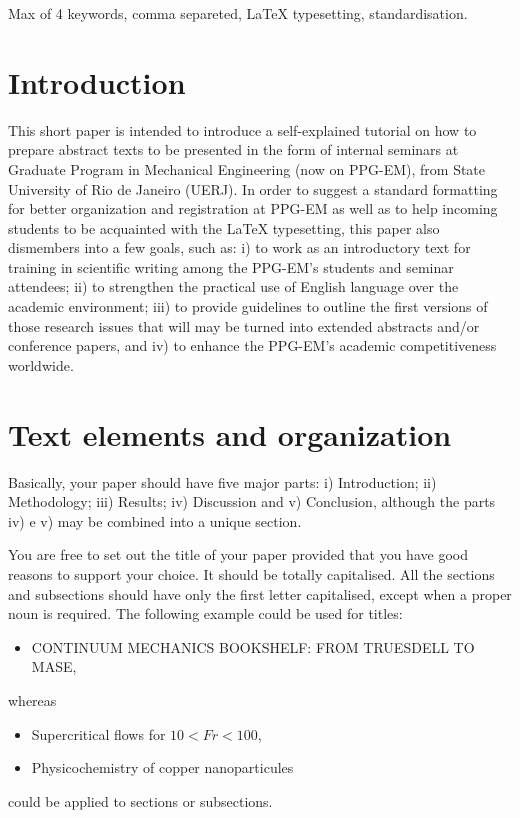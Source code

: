 \documentclass[date]{ppgem}
\begin{document}
\thispagestyle{plain}
\makeheader

\begin{multicols}{2}

\begin{keywords}
Max of 4 keywords, comma separeted, {\LaTeX} typesetting, standardisation.
\end{keywords}

\section{Introduction}

This short paper is intended to introduce a self-explained tutorial on how to prepare abstract texts to be presented in the form of internal seminars at Graduate Program in Mechanical Engineering (now on PPG-EM), from State University of Rio de Janeiro (UERJ). In order to suggest a standard formatting for better organization and registration at PPG-EM as well as to help incoming students to be acquainted with the {\LaTeX} typesetting, this paper also dismembers into a few goals, such as: i) to work as an introductory text for training in scientific writing among the PPG-EM's students and seminar attendees; ii) to strengthen the practical use of English language over the academic environment; iii) to provide guidelines to outline the first versions of those research issues that will may be turned into extended abstracts and/or conference papers, and iv) to enhance the PPG-EM's academic competitiveness worldwide. 

\section{Text elements and organization}

Basically, your paper should have five major parts: i) Introduction; ii) Methodology; iii) Results; iv) Discussion and v) Conclusion, although the parts iv) e v) may be combined into a unique section. 

You are free to set out the title of your paper provided that you have
good reasons to support your choice. It should be totally capitalised.
All the sections and subsections should have only the first letter
capitalised, except when a proper noun is required. The following
example could be used for titles:
\begin{itemize}
\item CONTINUUM MECHANICS BOOKSHELF: FROM TRUESDELL TO MASE, 
\end{itemize}
whereas
\begin{itemize}
\item  Supercritical flows for $ 10 < Fr < 100 $, \\
\item  Physicochemistry of copper nanoparticules  \\
\end{itemize}
could be applied to sections or subsections. 


\end{multicols}
\end{document}
